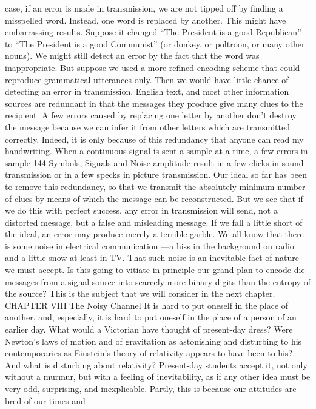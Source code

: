 {{{case, if an error is made in transmission, we are not tipped off by
finding a misspelled word. Instead, one word is replaced by
another. This might have embarrassing results. Suppose it changed
“The President is a good Republican” to “The President is a good
Communist” (or donkey, or poltroon, or many other nouns).
We might still detect an error by the fact that the word was
inappropriate. But suppose we used a more refined encoding
scheme that could reproduce grammatical utterances only. Then
we would have little chance of detecting an error in transmission.
English text, and most other information sources are redundant
in that the messages they produce give many clues to the recipient.
A few errors caused by replacing one letter by another don’t
destroy the message because we can infer it from other letters
which are transmitted correctly. Indeed, it is only because of this
redundancy that anyone can read my handwriting. When a continuous
signal is sent a sample at a time, a few errors in sample
144
Symbols, Signals and Noise
amplitude result in a few clicks in sound transmission or in a few
specks in picture transmission.
Our ideal so far has been to remove this redundancy, so that we
transmit the absolutely minimum number of clues by means of
which the message can be reconstructed. But we see that if we do
this with perfect success, any error in transmission will send, not
a distorted message, but a false and misleading message. If we fall
a little short of the ideal, an error may produce merely a terrible
garble.
We all know that there is some noise in electrical communication
—a hiss in the background on radio and a little snow at least in
TV. That such noise is an inevitable fact of nature we must accept.
Is this going to vitiate in principle our grand plan to encode die
messages from a signal source into scarcely more binary digits than
the entropy of the source?
This is the subject that we will consider in the next chapter.
CHAPTER VIII The Noisy
Channel
It is hard to put oneself in the place of another, and,
especially, it is hard to put oneself in the place of a person of an
earlier day. What would a Victorian have thought of present-day
dress? Were Newton’s laws of motion and of gravitation as astonishing
and disturbing to his contemporaries as Einstein’s theory
of relativity appears to have been to his? And what is disturbing
about relativity? Present-day students accept it, not only without
a murmur, but with a feeling of inevitability, as if any other idea
must be very odd, surprising, and inexplicable.
Partly, this is because our attitudes are bred of our times and
}}}
